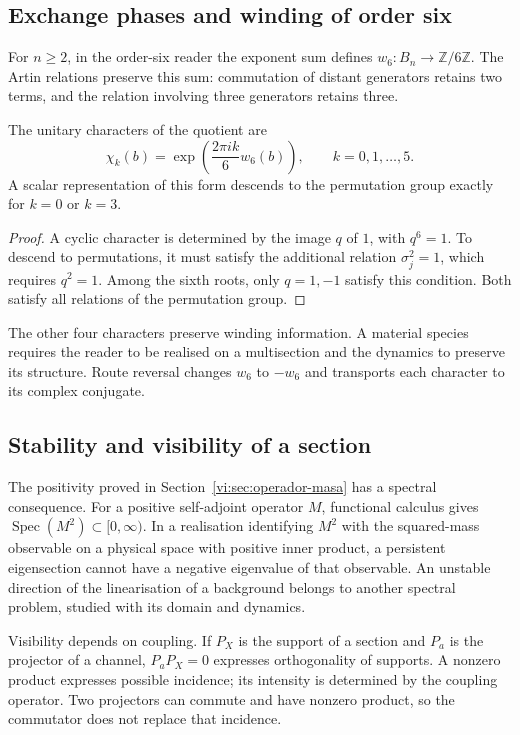 \subsection{Exchange phases and winding of order six}

For \(n\ge2\), in the order-six reader the exponent sum defines
$w_6:B_n\to\mathbb Z/6\mathbb Z$. The Artin relations
preserve this sum: commutation of distant generators retains
two terms, and the relation involving three generators retains three.

\begin{proposition}
\label{vi:prop:devanado-seis}
The unitary characters of the quotient are
\[
 \chi_k(b)=\exp\!\left(\frac{2\pi i k}{6}w_6(b)\right),
 \qquad k=0,1,\ldots,5.
\]
A scalar representation of this form descends to the permutation
group exactly for $k=0$ or $k=3$.
\end{proposition}
\begin{proof}
A cyclic character is determined by the image $q$ of $1$,
with $q^6=1$. To descend to permutations, it must satisfy the
additional relation $\sigma_j^2=1$, which requires $q^2=1$.
Among the sixth roots, only $q=1,-1$ satisfy this condition.
Both satisfy all relations of the permutation group.
\end{proof}

The other four characters preserve winding information.
A material species requires the reader to be realised on a
multisection and the dynamics to preserve its structure. Route
reversal changes $w_6$ to $-w_6$ and transports each character to its
complex conjugate.

\subsection{Stability and visibility of a section}

The positivity proved in
Section~\ref{vi:sec:operador-masa} has a spectral consequence.
For a positive self-adjoint operator $M$, functional calculus gives
$\operatorname{Spec}(M^2)\subset[0,\infty)$. In a realisation
identifying $M^2$ with the squared-mass observable on a
physical space with positive inner product, a persistent eigensection
cannot have a negative eigenvalue of that observable. An unstable
direction of the linearisation of a background belongs to another spectral
problem, studied with its domain and dynamics.

Visibility depends on coupling. If $P_X$ is the support of a
section and $P_a$ is the projector of a channel, $P_aP_X=0$ expresses
orthogonality of supports. A nonzero product expresses possible
incidence; its intensity is determined by the coupling operator.
Two projectors can commute and have nonzero product, so
the commutator does not replace that incidence.

